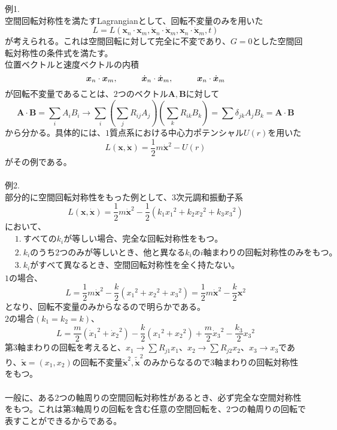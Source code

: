\documentclass{jsarticle}
\begin{document}
例1.\\
空間回転対称性を満たすLagrangianとして、回転不変量のみを用いた
\[L=L(\bm{x}_{n}\cdot\bm{x}_{m},\dot{\bm{x}}_{n}\cdot\dot{\bm{x}}_{m},\bm{x}_{n}\cdot\dot{\bm{x}}_{m},t)\]
が考えられる。これは空間回転に対して完全に不変であり、\(G=0\)とした空間回転対称性の条件式を満たす。\\
位置ベクトルと速度ベクトルの内積
\[\bm{x}_{n}\cdot\bm{x}_{m},\hspace{10mm}\dot{\bm{x}}_{n}\cdot\dot{\bm{x}}_{m},\hspace{10mm}\bm{x}_{n}\cdot\dot{\bm{x}}_{m}\]
が回転不変量であることは、\(2\)つのベクトル\(\bm{A},\bm{B}\)に対して
\[
\bm{A}\cdot\bm{B}=\sum_{i}A_{i}B_{i}\longrightarrow\sum_{i}\left(\sum_{j}R_{ij}A_{j}\right)\left(\sum_{k}R_{ik}B_{k}\right)=\sum\delta_{jk}A_{j}B_{k}=\bm{A}\cdot\bm{B}
\]
から分かる。具体的には、\(1\)質点系における中心力ポテンシャル\(U(r)\)を用いた
\[L(\bm{x},\dot{\bm{x}})=\frac{1}{2}m\dot{\bm{x}}^{2}-U(r)\]
がその例である。\\
\\
例2.\\
部分的に空間回転対称性をもった例として、\(3\)次元調和振動子系
\[L(\bm{x},\dot{\bm{x}})=\frac{1}{2}m\dot{\bm{x}}^{2}-\frac{1}{2}(k_{1}{x_{1}}^{2}+k_{2}{x_{2}}^{2}+k_{3}{x_{3}}^{2})\]
において、
\begin{align*}
&1.~すべてのk_{i}が等しい場合、完全な回転対称性をもつ。\\
&2.~k_{i}のうち2つのみが等しいとき、他と異なるk_{i}のi軸まわりの回転対称性のみをもつ。\\
&3.~k_{i}がすべて異なるとき、空間回転対称性を全く持たない。
\end{align*}
\(1\)の場合、
\[L=\frac{1}{2}m\dot{\bm{x}}^{2}-\frac{k}{2}({x_{1}}^{2}+{x_{2}}^{2}+{x_{3}}^{2})=\frac{1}{2}m\dot{\bm{x}}^{2}-\frac{k}{2}\bm{x}^{2}\]
となり、回転不変量のみからなるので明らかである。\\
\(2\)の場合\((k_{1}=k_{2}=k)\)、
\[L=\frac{m}{2}({\dot{x}_{1}}^{2}+{\dot{x}_{2}}^{2})-\frac{k}{2}({x_{1}}^{2}+{x_{2}}^{2})+\frac{m}{2}{\dot{x}_{3}}^{2}-\frac{k_{3}}{2}{x_{3}}^{2}\]
第\(3\)軸まわりの回転を考えると、\(x_{1}\to\sum R_{j1}x_{1}\)、\(x_{2}\to\sum R_{j2}x_{2}\)、\(x_{3}\to x_{3}\)であり、\(\widetilde{\bm{x}}=(x_{1},x_{2})\)の回転不変量\(\widetilde{\bm{x}}^{2},\widetilde{\dot{\bm{x}}}^{2}\)のみからなるので\(3\)軸まわりの回転対称性をもつ。\\
\\
一般に、ある\(2\)つの軸周りの空間回転対称性があるとき、必ず完全な空間対称性をもつ。これは第\(3\)軸周りの回転を含む任意の空間回転を、\(2\)つの軸周りの回転で表すことができるからである。\\
\end{document}
